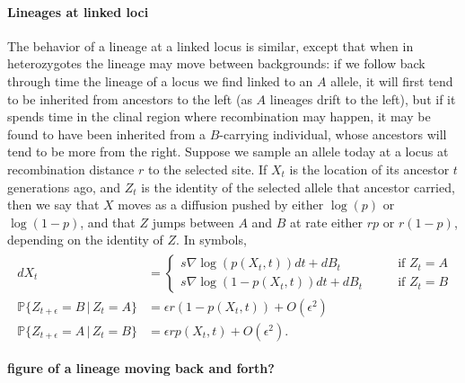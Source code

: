 \documentclass[12pt]{article}
\renewcommand{\P}{\mathbb{P}}
\newcommand{\grad}{\nabla}
\newcommand{\given}{\,\vert\,}
\begin{document}
\paragraph{Lineages at linked loci}
The behavior of a lineage at a linked locus is similar,
except that when in heterozygotes the lineage may move between backgrounds:
if we follow back through time the lineage of a locus we find linked to an $A$ allele, 
it will first tend to be inherited from ancestors to the left (as $A$ lineages drift to the left),
but if it spends time in the clinal region where recombination may happen,
it may be found to have been inherited from a $B$-carrying individual,
whose ancestors will tend to be more from the right.
Suppose we sample an allele today at a locus at recombination distance $r$ to the selected site.
If $X_t$ is the location of its ancestor $t$ generations ago,
and $Z_t$ is the identity of the selected allele that ancestor carried,
then we say that $X$ moves as a diffusion pushed by either $\log(p)$ or $\log(1-p)$,
and that $Z$ jumps between $A$ and $B$ at rate either $r p$ or $r(1-p)$,
depending on the identity of $Z$.
In symbols,
\begin{align}
    \begin{aligned} \label{eqn:lineage_motion}
        dX_t &= \begin{cases}
             s \grad \log(p(X_t,t)) dt + dB_t \qquad & \text{if } Z_t = A \\
             s \grad \log(1-p(X_t,t)) dt + dB_t \qquad & \text{if } Z_t = B 
        \end{cases} \\
        \P\{ Z_{t+\epsilon} = B \given Z_t = A \} &= \epsilon r (1-p(X_t,t)) + O(\epsilon^2) \\
        \P\{ Z_{t+\epsilon} = A \given Z_t = B \} &= \epsilon r p(X_t,t) + O(\epsilon^2)  .
    \end{aligned}
\end{align}

\textbf{figure of a lineage moving back and forth?}
\end{document}
